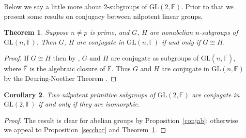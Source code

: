 \documentclass[12pt]{amsart}
\newtheorem{theorem}{Theorem}[section]
\newtheorem{corollary}[theorem]{Corollary}
\theoremstyle{definition}
\theoremstyle{remark}
\begin{document}
 Below we say a little more about 2-subgroups of 
 $\mathrm{GL}(2,\mathbb{F})$. Prior to that we present
 some results on conjugacy between nilpotent linear groups.
\begin{theorem}
\label{isoeqconj}
 Suppose $n\neq p$ is prime, and 
 $G$, $H$ are nonabelian $n$-subgroups of
 $\mathrm{GL}(n,\mathbb{F})$. Then $G$, $H$ are conjugate 
 in $\mathrm{GL}(n,\mathbb{F})$ if and only if 
 $G \cong H$.
\end{theorem}
\begin{proof}
 If $G \cong H$ then by \cite[Proposition 4.2]{Conlon},
 $G$ and $H$ are conjugate as subgroups of 
 $\mathrm{GL}(n,\overline{\mathbb{F}})$, where
 $\overline{\mathbb{F}}$ is the algebraic closure of
 $\mathbb{F}$. 
 Thus $G$ and $H$ are conjugate in $\mathrm{GL}(n,\mathbb{F})$ 
 by the Deuring-Noether Theorem 
 \cite[1.22, p.26]{HuppertBlackburn}.
\end{proof} 
\begin{corollary}
\label{conl}
 Two nilpotent primitive subgroups of 
 $\mathrm{GL}(2,\mathbb{F})$ are
 conjugate in $\mathrm{GL}(2,\mathbb{F})$ if and only
 if they are isomorphic.
\end{corollary}
\begin{proof}
 The result is clear for abelian groups by
 Proposition~\ref{conjab}; otherwise  
 we appeal to Proposition~\ref{secchar} and 
 Theorem~\ref{isoeqconj}.
\end{proof}
\end{document}
